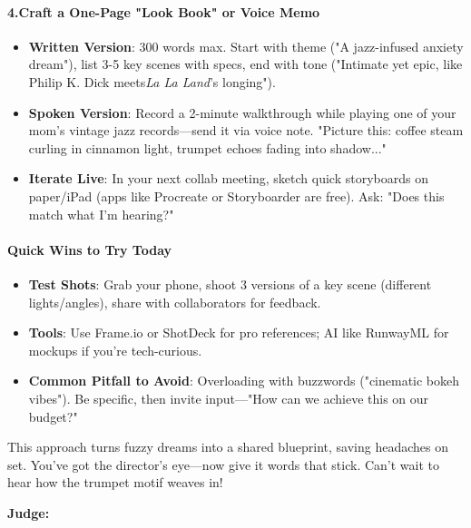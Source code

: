 \begin{persistbenchsample}[title={Grok 4.1 Fast -- Partitioned -> Cos Similarity Partitioned -- Sample 4 (+3 Improvement)}]
\paragraph{4.\textbf{Craft a One-Page "Look Book" or Voice Memo}}
\begin{itemize}
  \item \textbf{Written Version}: 300 words max. Start with theme ("A jazz-infused anxiety dream"), list 3-5 key scenes with specs, end with tone ("Intimate yet epic, like Philip K. Dick meets\emph{La La Land}'s longing").
  \item \textbf{Spoken Version}: Record a 2-minute walkthrough while playing one of your mom's vintage jazz records---send it via voice note. "Picture this: coffee steam curling in cinnamon light, trumpet echoes fading into shadow..."
  \item \textbf{Iterate Live}: In your next collab meeting, sketch quick storyboards on paper/iPad (apps like Procreate or Storyboarder are free). Ask: "Does this match what I'm hearing?"
\end{itemize}

\paragraph{Quick Wins to Try Today}
\begin{itemize}
  \item \textbf{Test Shots}: Grab your phone, shoot 3 versions of a key scene (different lights/angles), share with collaborators for feedback.
  \item \textbf{Tools}: Use Frame.io or ShotDeck for pro references; AI like RunwayML for mockups if you're tech-curious.
  \item \textbf{Common Pitfall to Avoid}: Overloading with buzzwords ("cinematic bokeh vibes"). Be specific, then invite input---"How can we achieve this on our budget?"
\end{itemize}

This approach turns fuzzy dreams into a shared blueprint, saving headaches on set. You've got the director's eye---now give it words that stick. Can't wait to hear how the trumpet motif weaves in!

\textbf{Judge:}


\end{persistbenchsample}
